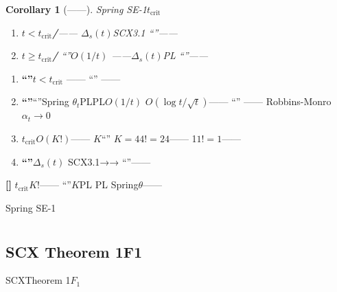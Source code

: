 \documentclass[11pt,a4paper]{article}
\newtheorem{corollary}[theorem]{Corollary}
\theoremstyle{remark}
\newcommand{\heuristic}{\textnormal{\textbf{[]}}}
\begin{document}
\begin{corollary}[——]
\label{cor:qualitative_change}
Spring SE-1\textbf{}$t_{\text{crit}}$

\begin{enumerate}[label=(\arabic*)]
    \item \textbf{$t < t_{\text{crit}}$/}——
          $\Delta_s(t)$SCX3.1
          ``''——
          
    \item \textbf{$t \geq t_{\text{crit}}$/}
          ``''$O(1/t)$
          ——$\Delta_s(t)$PL
          ``''——\textbf{}\textbf{}
\end{enumerate}
\end{corollary}

\textbf{}

\begin{enumerate}[label=(\arabic*)]
    \item \textbf{``''}$t < t_{\text{crit}}$
          \textbf{}——
          ``''
          \textbf{}
          \textbf{}——
          
    \item \textbf{``''}``''Spring
          $\theta_t$PLPL$O(1/t)$
          $O(\log t/\sqrt{t})$\textbf{}——
          ``''
          \textbf{}\textbf{}——
          Robbins-Monro$\alpha_t \to 0$
    \item \textbf{}$t_{\text{crit}}$$O(K!)$——
          $K$``''
          $K=4$$4! = 24$——
          1$1! = 1$——
          
    \item \textbf{``''}$\Delta_s(t)$
          SCX3.1→→
          ``''——
          
\end{enumerate}

\heuristic{} \textbf{}$t_{\text{crit}}$$K!$——
``''$K$PL
PL
Spring$\theta$——

Spring SE-1

\section{}

\subsection{SCX Theorem 1F1}

SCXTheorem 1$F_1$
\end{document}
